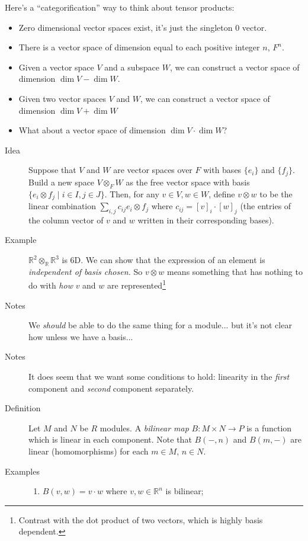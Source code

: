 \documentclass[12pt]{article}
\newcommand{\bbR}{\mathbb{R}}
\begin{document}
Here's a ``categorification'' way to think about tensor products: 
\begin{itemize}
\item Zero dimensional vector spaces exist, it's just the singleton 0
  vector.
\item There is a vector space of dimension equal to each positive
  integer $n$, $F^n$. 
\item Given a vector space $V$ and a subspace $W$, we can construct a
  vector space of dimension $\dim V - \dim W$.
\item Given two vector spaces $V$ and $W$, we can construct a vector
  space of dimension $\dim V + \dim W$
\item What about a vector space of dimension $\dim V \cdot \dim W$?
\end{itemize}
\begin{description}
\item[Idea] Suppose that $V$ and $W$ are vector spaces over $F$ with
  bases $\{e_i\}$ and $\{f_j\}$. Build a new space $V\otimes_F W$ as
  the free vector space with basis $\{e_i \otimes f_j\mid i\in I, j\in
  J\}$. Then, for any $v\in V, w\in W$, define $v\otimes w$ to be the
  linear combination $\sum_{i,j} c_{ij}e_i\otimes f_j$ where
  $c_{ij}=[v]_i \cdot [w]_j$ (the entries of the column vector of $v$
  and $w$ written in their corresponding bases). 
\item[Example] $\bbR^2 \otimes_\bbR \bbR^3$ is 6D. We can show that
  the expression of an element is \emph{independent of basis chosen.}
  So $v\otimes w$ means something that has nothing to do with
  \emph{how} $v$ and $w$ are represented\footnote{Contrast with the
    dot product of two vectors, which is highly basis dependent.} 
\item[Notes] We \emph{should} be able to do the same thing for a
  module... but it's not clear how unless we have a basis...
\item[Notes] It does seem that we want some conditions to hold:
  linearity in the \emph{first} component and \emph{second} component
  separately.
\item[Definition] Let $M$ and $N$ be $R$ modules. A \emph{bilinear
    map} $B: M\times N \rightarrow P$ is a function which is linear in
  each component. Note that $B(-,n)$ and $B(m,-)$ are linear
  (homomorphisms) for each $m\in M$, $n\in N$. 
\item[Examples]
  \begin{enumerate}
  \item $B(v,w) = v\cdot w$ where $v,w\in \bbR^n$ is bilinear;

\end{enumerate}
\end{description}
\end{document}
